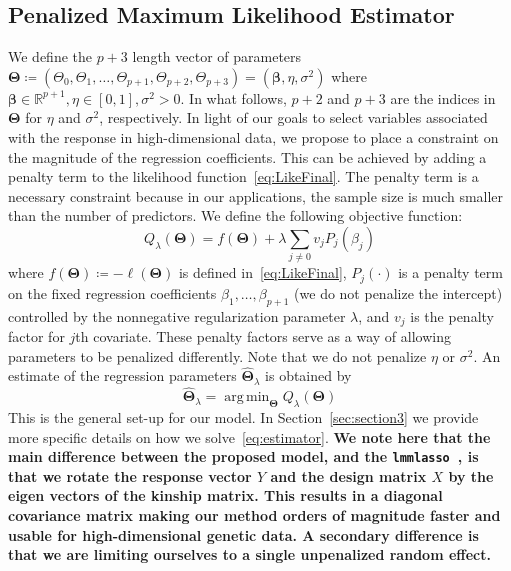 \documentclass[12pt,letter]{article}\usepackage[]{graphicx}\usepackage[]{color}
\newcommand{\bTheta}{\boldsymbol{\Theta}}
\newcommand{\bbeta}{\boldsymbol{\beta}}
\DeclareMathOperator*{\argmin}{arg\,min}
\begin{document}



\subsection{Penalized Maximum Likelihood Estimator}
We define the $p+3$  length vector of parameters $\bTheta \coloneqq \left(\Theta_0, \Theta_1, \ldots, \Theta_{p+1}, \Theta_{p+2}, \Theta_{p+3}\right) =  \left(\bbeta, \eta, \sigma^2 \right)$ where $\bbeta \in \mathbb{R}^{p+1}, \eta \in [0,1], \sigma^2 >0$. In what follows, $p+2$ and $p+3$ are the indices in $\bTheta$ for $\eta$ and $\sigma^2$, respectively. In light of our goals to select variables associated with the response in high-dimensional data, we propose to place a constraint on the magnitude of the regression coefficients. This can be achieved by adding a penalty term to the likelihood function~\eqref{eq:LikeFinal}. The penalty term is a necessary constraint because in our applications, the sample size is much smaller than the number of predictors. We define the following objective function:
\begin{equation}
	Q_{\lambda}(\bTheta) = f(\bTheta) + \lambda \sum_{j\neq 0} v_j P_j(\beta_j)
\end{equation}
where $f(\bTheta)\coloneqq-\ell(\bTheta)$ is defined in~\eqref{eq:LikeFinal}, $P_j(\cdot)$ is a penalty term on the fixed regression coefficients $\beta_1, \ldots, \beta_{p+1}$ (we do not penalize the intercept) controlled by the nonnegative regularization parameter $\lambda$, and $v_j$ is the penalty factor for $j$th covariate. These penalty factors serve as a way of allowing parameters to be penalized differently. Note that we do not penalize $\eta$ or $\sigma^2$. An estimate of the regression parameters $\widehat{\bTheta}_{\lambda}$ is obtained by
\begin{equation}
	\widehat{\bTheta}_{\lambda} = \argmin_{\bTheta} Q_{\lambda}(\bTheta) \label{eq:estimator}
\end{equation}
This is the general set-up for our model. In Section~\ref{sec:section3} we provide more specific details on how we solve~\eqref{eq:estimator}. \textbf{We note here that the main difference between the proposed model, and the \texttt{lmmlasso}~\citep{schelldorfer2011estimation}, is that we rotate the response vector $Y$ and the design matrix $X$ by the eigen vectors of the kinship matrix. This results in a diagonal covariance matrix making our method orders of magnitude faster and usable for high-dimensional genetic data. A secondary difference is that we are limiting ourselves to a single unpenalized random effect.} 
\end{document}
